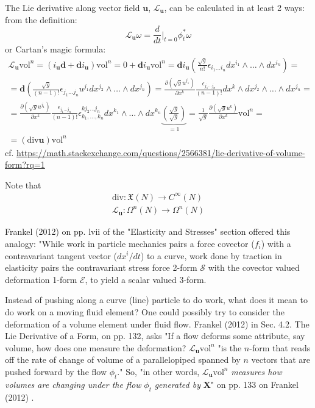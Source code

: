 The Lie derivative along vector field $\mathbf{u}$, $\mathcal{L}_{\mathbf{u}}$, can be calculated in at least 2 ways: from the definition:
\[
\mathcal{L}_{\mathbf{u}} \omega  =\frac{d}{dt} \left. \right|_{t = 0} \phi_t^*\omega
\]
or Cartan's magic formula:
\begin{equation}
\begin{gathered}
	\mathcal{L}_{\mathbf{u}} \text{vol}^n = (i_{\mathbf{u}}\mathbf{d} + \mathbf{d}i_{\mathbf{u}}) \text{vol}^n = 0 + \mathbf{d}i_{\mathbf{u}} \text{vol}^n = \mathbf{d}i_{\mathbf{u}} \left( \frac{ \sqrt{g}}{n!} \epsilon_{i_1 \dots i_n} dx^{i_1} \wedge \dots \wedge dx^{i_n} \right) = \\ 
	= \mathbf{d} \left( \frac{\sqrt{g}}{(n-1)! } \epsilon_{j_1 \dots j_n} u^{j_1} dx^{j_2} \wedge \dots \wedge dx^{j_n} \right) = \frac{ \partial (\sqrt{g} u^{j_1} )}{ \partial x^k} \frac{ \epsilon_{j_1 \dots j_n}}{(n-1)!} dx^k \wedge dx^{j_2} \wedge \dots \wedge dx^{j_n} = \\
	= \frac{ \partial (\sqrt{g} u^{j_1}) }{ \partial x^k} \frac{ \epsilon_{j_1 \dots j_n} }{ (n-1)! } \epsilon^{k j_2 \dots j_n}_{ k_1, \dots, k_n} dx^{k_1} \wedge \dots \wedge dx^{k_n} \underbrace{\left( \frac{ \sqrt{g}}{ \sqrt{g}} \right)}_{=1} = \frac{1}{\sqrt{g}} \frac{ \partial ( \sqrt{g} u^k) }{ \partial x^k} \text{vol}^n =  \\
	= (\text{div}{\mathbf{u}}) \text{vol}^n
\end{gathered}
\end{equation}
cf. \url{https://math.stackexchange.com/questions/2566381/lie-derivative-of-volume-form?rq=1}

Note that
\[
\begin{gathered}
	\text{div}: \mathfrak{X}(N) \to C^{\infty}(N) \\ 
 \mathcal{L}_{\mathbf{u}}: \Omega^n(N) \to \Omega^n(N) 
\end{gathered}
\]

Frankel (2012) \cite{dgdt:TFrankel2012} on pp. lvii of the "Elasticity and Stresses" section offered this analogy: "While work in particle mechanics pairs a force covector ($f_i$) with a contravariant tangent vector ($dx^i/dt$) to a curve, work done by traction in elasticity pairs the contravariant stress force 2-form $\mathcal{S}$ with the covector valued deformation 1-form $\mathcal{E}$, to yield a scalar valued 3-form.

Instead of pushing along a curve (line) particle to do work, what does it mean to do work on a moving fluid element? One could possibly try to consider the deformation of a volume element under fluid flow. Frankel (2012) \cite{dgdt:TFrankel2012} in Sec. 4.2. The Lie Derivative of a Form, on pp. 132, asks "If a flow deforms some attribute, say volume, how does one measure the deformation? $\mathcal{L}_{\mathbf{u}}\text{vol}^n$ "is the $n$-form that reads off the rate of change of volume of a parallelopiped spanned by $n$ vectors that are pushed forward by the flow $\phi_t$." So, "in other words, $\mathcal{L}_{\mathbf{u}}\text{vol}^n$ \emph{measures how volumes are changing under the flow} $\phi_t$ \emph{generated by} $\mathbf{X}$" on pp. 133 on Frankel (2012) \cite{dgdt:TFrankel2012}. 

